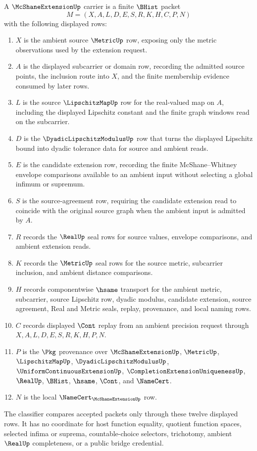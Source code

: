 \begin{definition}
\label{def:mcshane-extension-carrier}
A $\McShaneExtensionUp$ carrier is a finite $\BHist$ packet
$$
M=(X,A,L,D,E,S,R,K,H,C,P,N)
$$
with the following displayed rows:
\begin{enumerate}
\item $X$ is the ambient source $\MetricUp$ row, exposing only the metric observations used by the extension request.
\item $A$ is the displayed subcarrier or domain row, recording the admitted source points, the inclusion route into $X$, and the finite membership evidence consumed by later rows.
\item $L$ is the source $\LipschitzMapUp$ row for the real-valued map on $A$, including the displayed Lipschitz constant and the finite graph windows read on the subcarrier.
\item $D$ is the $\DyadicLipschitzModulusUp$ row that turns the displayed Lipschitz bound into dyadic tolerance data for source and ambient reads.
\item $E$ is the candidate extension row, recording the finite McShane--Whitney envelope comparisons available to an ambient input without selecting a global infimum or supremum.
\item $S$ is the source-agreement row, requiring the candidate extension read to coincide with the original source graph when the ambient input is admitted by $A$.
\item $R$ records the $\RealUp$ seal rows for source values, envelope comparisons, and ambient extension reads.
\item $K$ records the $\MetricUp$ seal rows for the source metric, subcarrier inclusion, and ambient distance comparisons.
\item $H$ records componentwise $\hsame$ transport for the ambient metric, subcarrier, source Lipschitz row, dyadic modulus, candidate extension, source agreement, Real and Metric seals, replay, provenance, and local naming rows.
\item $C$ records displayed $\Cont$ replay from an ambient precision request through $X,A,L,D,E,S,R,K,H,P,N$.
\item $P$ is the $\Pkg$ provenance over $\McShaneExtensionUp$, $\MetricUp$, $\LipschitzMapUp$, $\DyadicLipschitzModulusUp$, $\UniformContinuousExtensionUp$, $\CompletionExtensionUniquenessUp$, $\RealUp$, $\BHist$, $\hsame$, $\Cont$, and $\NameCert$.
\item $N$ is the local $\NameCert_{\McShaneExtensionUp}$ row.
\end{enumerate}
The classifier compares accepted packets only through these twelve displayed rows. It has no coordinate for host function equality, quotient function spaces, selected infima or suprema, countable-choice selectors, trichotomy, ambient $\RealUp$ completeness, or a public bridge credential.
\end{definition}

